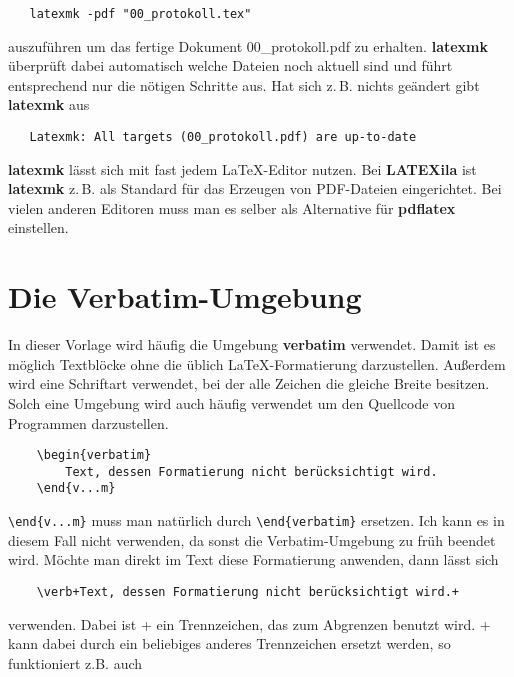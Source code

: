 \begin{verbatim}
   latexmk -pdf "00_protokoll.tex"
\end{verbatim}

auszuführen um das fertige Dokument 00\_protokoll.pdf zu erhalten. \textbf{latexmk} überprüft dabei automatisch welche Dateien noch aktuell sind und führt entsprechend nur die nötigen Schritte aus. Hat sich z.\,B. nichts geändert gibt \textbf{latexmk} aus

\begin{verbatim}
   Latexmk: All targets (00_protokoll.pdf) are up-to-date
\end{verbatim}

\textbf{latexmk} lässt sich mit fast jedem \LaTeX-Editor nutzen. Bei \textbf{LATEXila} ist \textbf{latexmk} z.\,B. als Standard für das Erzeugen von PDF-Dateien eingerichtet. Bei vielen anderen Editoren muss man es selber als Alternative für \textbf{pdflatex} einstellen.

\section{Die Verbatim-Umgebung}

In dieser Vorlage wird häufig die Umgebung \textbf{verbatim} verwendet. Damit ist es möglich Textblöcke ohne die üblich \LaTeX-Formatierung darzustellen. Außerdem wird eine Schriftart verwendet, bei der alle Zeichen die gleiche Breite besitzen. Solch eine Umgebung wird auch häufig verwendet um den Quellcode von Programmen darzustellen.

\begin{verbatim}
    \begin{verbatim}
        Text, dessen Formatierung nicht berücksichtigt wird.
    \end{v...m}
\end{verbatim}

\verb+\end{v...m}+ muss man natürlich durch \verb+\end{verbatim}+ ersetzen. Ich kann es in diesem Fall nicht verwenden, da sonst die Verbatim-Umgebung zu früh beendet wird. Möchte man direkt im Text diese Formatierung anwenden, dann lässt sich

\begin{verbatim}
    \verb+Text, dessen Formatierung nicht berücksichtigt wird.+
\end{verbatim}

verwenden. Dabei ist + ein Trennzeichen, das zum Abgrenzen benutzt wird. + kann dabei durch ein beliebiges anderes Trennzeichen ersetzt werden, so funktioniert z.B. auch

